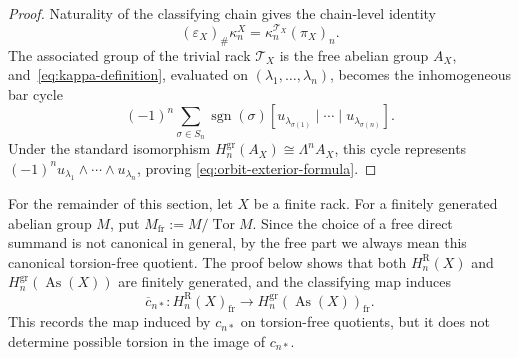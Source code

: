 \documentclass[11pt]{article}
\DeclareMathOperator{\As}{As}
\DeclareMathOperator{\Tor}{Tor}
\DeclareMathOperator{\sgn}{sgn}
\newcommand{\gr}{\mathrm{gr}}
\newcommand{\R}{\mathrm R}
\begin{document}
\begin{proof}
Naturality of the classifying chain gives the chain-level identity
\[
 (\varepsilon_X)_\#\kappa_n^X
 =\kappa_n^{\mathcal T_X}(\pi_X)_n.
\]
The associated group of the trivial rack $\mathcal T_X$ is the free abelian
group $A_X$, and~\eqref{eq:kappa-definition}, evaluated on
$(\lambda_1,\ldots,\lambda_n)$, becomes the inhomogeneous bar cycle
\[
 (-1)^n\sum_{\sigma\in S_n}\sgn(\sigma)
 [u_{\lambda_{\sigma(1)}}\mid\cdots\mid u_{\lambda_{\sigma(n)}}].
\]
Under the standard isomorphism
$H_n^{\gr}(A_X)\cong\Lambda^nA_X$, this cycle represents
$(-1)^n u_{\lambda_1}\wedge\cdots\wedge u_{\lambda_n}$, proving
\eqref{eq:orbit-exterior-formula}.
\end{proof}

For the remainder of this section, let $X$ be a finite rack. For a finitely
generated abelian group $M$, put $M_{\mathrm{fr}}:=M/\Tor M$. Since the choice
of a free direct summand is not canonical in general, by the free part we
always mean this canonical torsion-free quotient. The proof below shows that
both $H_n^\R(X)$ and $H_n^{\gr}(\As(X))$ are finitely generated, and the
classifying map induces
\[
 \overline c_{n*}\colon H_n^\R(X)_{\mathrm{fr}}
 \longrightarrow H_n^{\gr}(\As(X))_{\mathrm{fr}}.
\]
This records the map induced by $c_{n*}$ on torsion-free quotients, but it
does not determine possible torsion in the image of $c_{n*}$.
\end{document}
